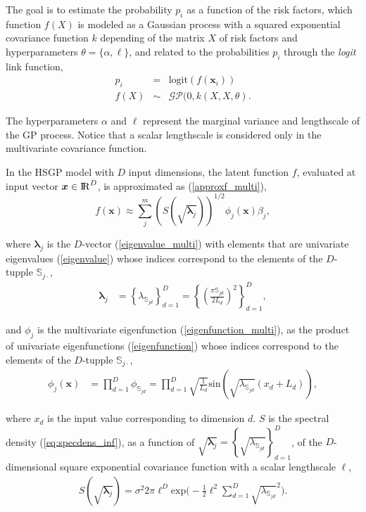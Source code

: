 \documentclass[]{interact}
\theoremstyle{plain}%
\theoremstyle{definition}
\theoremstyle{remark}
\begin{document}
\noindent The goal is to estimate the 
 probability $p_i$ as a function of the risk factors, which function $f(X)$ is modeled as a Gaussian process with a squared exponential covariance function $k$ depending of the matrix $X$ of risk factors and hyperparameters $\theta=\{\alpha,\ell\}$, and related to the probabilities $p_i$ through the {\it logit} link function,
%
\begin{eqnarray*} \label{eq:gpprior_gay}
p_i &=& \text{logit}(f(\bm{x}_i)) \nonumber \\
f(X) &\sim& \mathcal{GP}(0, k(X,X, \theta).
\end{eqnarray*}

\noindent The hyperparameters $\alpha$ and $\ell$ represent the marginal variance and lengthscale of the GP process. Notice that a scalar lengthscale is considered only in the multivariate covariance function.

In the HSGP model with $D$ input dimensions, the latent function $f$, evaluated at input vector $\bm{x} \in {\rm I\!R}^D$, is approximated as (\ref{approxf_multi}),
%
\begin{equation*}
f(\bm{x}) \approx \sum_{j}^m \left( S(\sqrt{\bm{\lambda}_j})\right)^{1/2} \phi_j(\bm{x}) \beta_j,
\end{equation*}

\noindent where $\bm{\lambda}_j$ is the $D$-vector (\ref{eigenvalue_multi}) with elements that are univariate eigenvalues (\ref{eigenvalue}) whose indices correspond to the elements of the $D$-tupple $\mathbb{S}_{j\cdotp}$,
%
\begin{align*}
\bm{\lambda}_j &= \left\{ \lambda_{\mathbb{S}_{jd}} \right\}_{d=1}^{D} = \left\{ \left(\tfrac{\pi \mathbb{S}_{jd}}{2L_d}\right)^2 \right\}_{d=1}^{D},
\end{align*}

\noindent and $\phi_j$ is the multivariate eigenfunction (\ref{eigenfunction_multi}), as the product of univariate eigenfunctions (\ref{eigenfunction}) whose indices correspond to the elements of the $D$-tupple $\mathbb{S}_{j\cdotp}$,
%
\begin{align*}
\phi_j(\bm{x}) &= \prod_{d=1}^{D} \phi_{\mathbb{S}_{jd}} = \prod_{d=1}^{D} \sqrt{\frac{1}{L_d}} \text{sin}\left(\sqrt{\lambda_{\mathbb{S}_{jd}}}(x_d+L_d)\right),
\end{align*}

\noindent where $x_d$ is the input value corresponding to dimension $d$. $S$ is the spectral density (\ref{eq:specdens_inf}), as a function of $\sqrt{\bm{\lambda}_j}= \left\{ \sqrt{\lambda_{\mathbb{S}_{jd}}} \right\}_{d=1}^{D}$, of the $D$-dimensional square exponential covariance function with a scalar lengthscale $\ell$,
%
\begin{eqnarray*}
S(\sqrt{\bm{\lambda}_j})= \sigma^2 2\pi \ell^D  \mathrm{exp}\bigg(-\frac{1}{2} \ell^2 \sum_{d=1}^D  \sqrt{\lambda_{\mathbb{S}_{jd}}}^2 \bigg). 
\end{eqnarray*}
\end{document}
